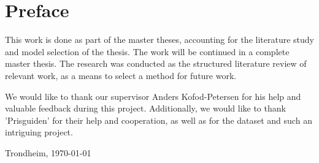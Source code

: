 \section*{Preface}



\vspace{1cm}

This work is done as part of the master theses, accounting for the literature study and model selection of the thesis.
The work will be continued in a complete master thesis.
The research was conducted as the structured literature review of relevant work,
as a means to select a method for future work.

We would like to thank our supervisor Anders Kofod-Petersen for his help and valuable feedback during this project.
Additionally, we would like to thank 'Prisguiden' for their help and cooperation,
as well as for the dataset and such an intriguing project.

\vfill

\hfill \thesisAuthor

\hfill Trondheim, \today